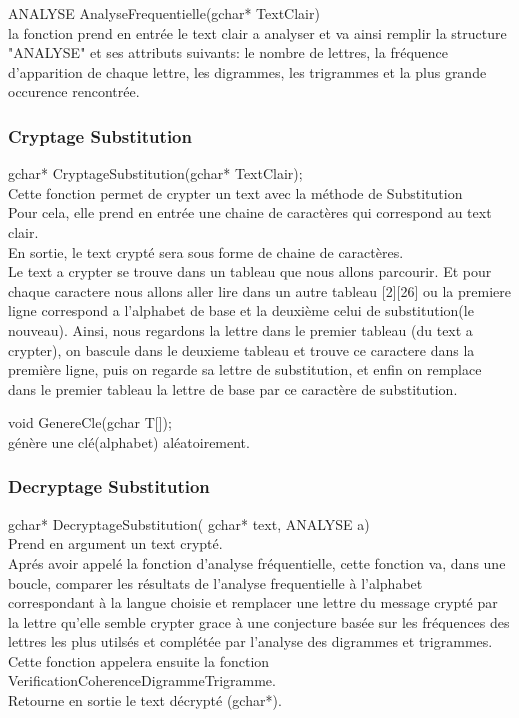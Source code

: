 \documentclass[a4]{article}
\begin{document}
		
		
	ANALYSE AnalyseFrequentielle(gchar* TextClair)\\
		la fonction prend en entrée le text clair a analyser et va ainsi remplir la structure "ANALYSE" et 
		ses attributs suivants:
		le nombre de lettres, la fréquence d'apparition de chaque lettre, les digrammes, les trigrammes
		et la plus grande occurence rencontrée.\\
		
	\subsubsection{Cryptage Substitution}
	gchar* CryptageSubstitution(gchar* TextClair);\\
		Cette fonction permet de crypter un text avec la méthode de Substitution\\
		Pour cela, elle prend en entrée une chaine de caractères qui correspond au text clair.\\
		En sortie, le text crypté sera sous forme de chaine de caractères.\\
		Le text a crypter se trouve dans un tableau que nous allons parcourir. Et pour chaque caractere 
		nous allons aller lire dans un autre tableau [2][26] ou la premiere ligne correspond a l'alphabet
		de base et la deuxième celui de substitution(le nouveau). Ainsi, nous regardons la lettre dans 
		le premier tableau (du text a crypter), on bascule dans le deuxieme tableau et trouve ce caractere dans la
		première ligne, puis on regarde sa lettre de substitution, et enfin on remplace dans le premier tableau 
		la lettre de base par ce caractère de substitution.
		
	void GenereCle(gchar T[]);\\
		génère une clé(alphabet) aléatoirement.
	
	\subsubsection{Decryptage Substitution}
	gchar* DecryptageSubstitution( gchar* text, ANALYSE a)\\
		Prend en argument un text crypté.\\
		Aprés avoir appelé la fonction d'analyse fréquentielle, cette fonction va, 
		dans une boucle, comparer les résultats de l'analyse frequentielle à l'alphabet
		 correspondant à la langue choisie et remplacer une lettre du message crypté 
		 par la lettre qu'elle semble crypter grace à une conjecture basée sur les 
		 fréquences des lettres les plus utilsés et complétée par l'analyse des digrammes 
		 et trigrammes. Cette fonction appelera ensuite la fonction VerificationCoherenceDigrammeTrigramme.\\
		Retourne en sortie le text décrypté (gchar*).\\
\end{document}
